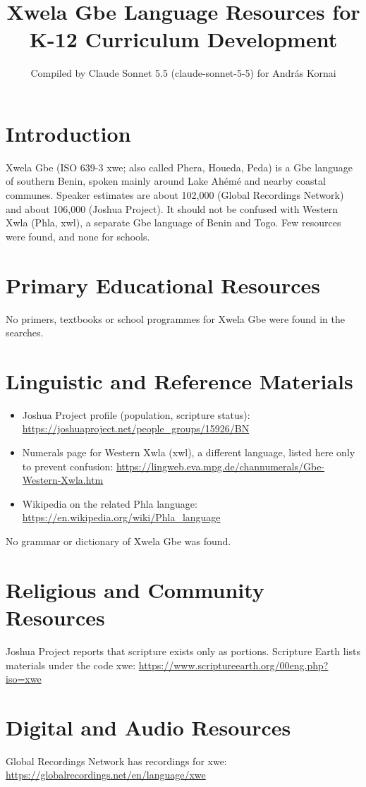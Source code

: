 \documentclass[12pt]{article}
\title{Xwela Gbe Language Resources for K-12 Curriculum Development}
\author{Compiled by Claude Sonnet 5.5 (claude-sonnet-5-5) for Andr\'as Kornai}
\date{}
\begin{document}
\maketitle

\section{Introduction}
Xwela Gbe (ISO 639-3 xwe; also called Phera, Houeda, Peda) is a Gbe language of southern Benin, spoken mainly around Lake Ahémé and nearby coastal communes. Speaker estimates are about 102,000 (Global Recordings Network) and about 106,000 (Joshua Project). It should not be confused with Western Xwla (Phla, xwl), a separate Gbe language of Benin and Togo. Few resources were found, and none for schools.

\section{Primary Educational Resources}
No primers, textbooks or school programmes for Xwela Gbe were found in the searches.

\section{Linguistic and Reference Materials}
\begin{itemize}
\item Joshua Project profile (population, scripture status): \url{https://joshuaproject.net/people_groups/15926/BN}
\item Numerals page for Western Xwla (xwl), a different language, listed here only to prevent confusion: \url{https://lingweb.eva.mpg.de/channumerals/Gbe-Western-Xwla.htm}
\item Wikipedia on the related Phla language: \url{https://en.wikipedia.org/wiki/Phla_language}
\end{itemize}
No grammar or dictionary of Xwela Gbe was found.

\section{Religious and Community Resources}
Joshua Project reports that scripture exists only as portions. Scripture Earth lists materials under the code xwe: \url{https://www.scriptureearth.org/00eng.php?iso=xwe}

\section{Digital and Audio Resources}
Global Recordings Network has recordings for xwe: \url{https://globalrecordings.net/en/language/xwe}
\end{document}
